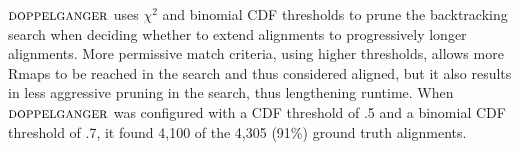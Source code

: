 $\mbox{\rm {\sc doppelganger}}$ uses $\chi^2$ and binomial CDF thresholds to prune the backtracking search when deciding whether to extend alignments to progressively longer alignments.  More permissive match criteria, using higher thresholds, allows  more Rmaps to be reached in the search and thus considered aligned, but it also results in less aggressive pruning in the search, thus lengthening runtime.  When $\mbox{\rm {\sc doppelganger}}$ was configured with a CDF threshold of .5 and a binomial CDF threshold of .7, it found 4,100 of the 4,305 (91\%) ground truth alignments. 



